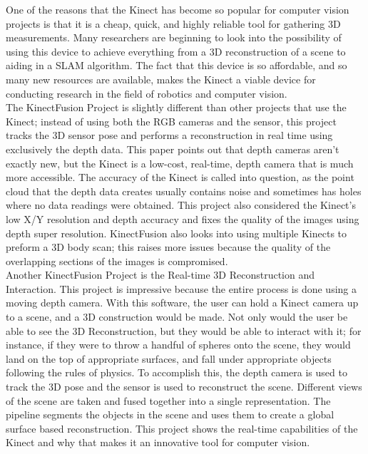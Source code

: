 \documentclass[12pt,twocolumn]{article}
\begin{document}
One of the reasons that the Kinect has become so popular for computer vision projects is that it is a cheap, quick, and highly reliable tool for gathering 3D measurements. Many researchers are beginning to look into the possibility of using this device to achieve everything from a 3D reconstruction of a scene to aiding in a SLAM algorithm. The fact that this device is so affordable, and so many new resources are available, makes the Kinect a viable device for conducting research in the field of robotics and computer vision.\\
\indent The KinectFusion Project is slightly different than other projects that use the Kinect; instead of using both the RGB cameras and the sensor, this project tracks the 3D sensor pose and performs a reconstruction in real time using exclusively the depth data. This paper points out that depth cameras aren't exactly new, but the Kinect is a low-cost, real-time, depth camera that is much more accessible. The accuracy of the Kinect is called into question, as the point cloud that the depth data creates usually contains noise and sometimes has holes where no data readings were obtained. This project also considered the Kinect's low X/Y resolution and depth accuracy and fixes the quality of the images using depth super resolution. KinectFusion also looks into using multiple Kinects to preform a 3D body scan; this raises more issues because the quality of the overlapping sections of the images is compromised. \\
\indent	Another KinectFusion Project is the Real-time 3D Reconstruction and Interaction. This project is impressive because the entire process is done using a moving depth camera. With this software, the user can hold a Kinect camera up to a scene, and a 3D construction would be made. Not only would the user be able to see the 3D Reconstruction, but they would be able to interact with it; for instance, if they were to throw a handful of spheres onto the scene, they would land on the top of appropriate surfaces, and fall under appropriate objects following the rules of physics. To accomplish this, the depth camera is used to track the 3D pose and the sensor is used to reconstruct the scene. Different views of the scene are taken and fused together into a single representation. The pipeline segments the objects in the scene and uses them to create a global surface based reconstruction. This project shows the real-time capabilities of the Kinect and why that makes it an innovative tool for computer vision.\\
\end{document}
